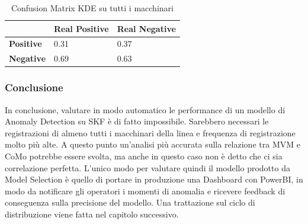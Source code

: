 \begin{table}[]
	\centering
	\begin{tabular}{|l|l|l|}
		\hline
		                  & \textbf{Real Positive} & \textbf{Real Negative} \\ \hline
		\textbf{Positive} & 0.31            & 0.37            \\ \hline
		\textbf{Negative} & 0.69            & 0.63            \\ \hline
	\end{tabular}
	\caption{\label{cm_quality_all}Confusion Matrix KDE su tutti i macchinari}
	
\end{table}

\subsubsection{Conclusione}
In conclusione, valutare in modo automatico le performance di un modello di Anomaly Detection su SKF è di fatto impossibile. Sarebbero necessari le registrazioni di almeno tutti i macchinari della linea e frequenza di registrazione molto più alte. A questo punto un'analisi più accurata sulla relazione tra MVM e CoMo potrebbe essere svolta, ma anche in questo caso non è detto che ci sia correlazione perfetta.
L'unico modo per valutare quindi il modello prodotto da Model Selection è quello di portare in produzione una Dashboard con PowerBI, in modo da notificare gli operatori i momenti di anomalia e ricevere feedback di conseguenza sulla precisione del modello.
Una trattazione sul ciclo di distribuzione viene fatta nel capitolo successivo.